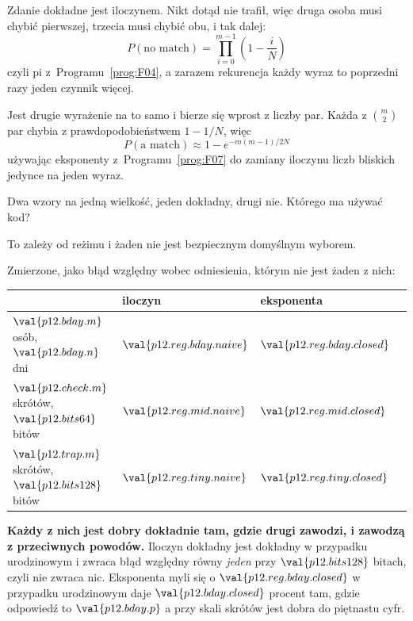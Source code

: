 \begin{fr}
Zdanie dokładne jest iloczynem. Nikt dotąd nie trafił, więc druga osoba musi
chybić pierwszej, trzecia musi chybić obu, i tak dalej:
\[ P(\text{no match}) = \prod_{i=0}^{m-1}\left(1 - \frac{i}{N}\right) \]
czyli pi z~Programu~\ref{prog:F04}, a zarazem rekurencja \dash{} każdy wyraz
to poprzedni razy jeden czynnik więcej.

Jest drugie wyrażenie na to samo i bierze się wprost z liczby par. Każda z
$\binom{m}{2}$ par chybia z prawdopodobieństwem $1 - 1/N$, więc
\[ P(\text{a match}) \approx 1 - e^{-m(m-1)/2N} \]
używając eksponenty z~Programu~\ref{prog:F07} do zamiany iloczynu liczb
bliskich jedynce na jeden wyraz.

Dwa wzory na jedną wielkość, jeden dokładny, drugi nie. Którego ma używać
kod?
\nextframe
\end{fr}

\begin{fr}
\begin{ansblock}
To zależy od reżimu i żaden nie jest bezpiecznym domyślnym wyborem.
\end{ansblock}

Zmierzone, jako błąd względny wobec odniesienia, którym nie jest żaden z nich:

\begin{center}
\begin{tabular}{llll}
\toprule
 & \textbf{iloczyn} & \textbf{eksponenta} \\
\midrule
$\val{p12.bday.m}$ osób, $\val{p12.bday.n}$ dni
  & $\val{p12.reg.bday.naive}$ & $\val{p12.reg.bday.closed}$ \\
$\val{p12.check.m}$ skrótów, $\val{p12.bits64}$ bitów
  & $\val{p12.reg.mid.naive}$ & $\val{p12.reg.mid.closed}$ \\
$\val{p12.trap.m}$ skrótów, $\val{p12.bits128}$ bitów
  & $\val{p12.reg.tiny.naive}$ & $\val{p12.reg.tiny.closed}$ \\
\bottomrule
\end{tabular}
\end{center}

\textbf{Każdy z nich jest dobry dokładnie tam, gdzie drugi zawodzi, i zawodzą
z przeciwnych powodów.} Iloczyn dokładny jest dokładny w przypadku
urodzinowym i zwraca błąd względny równy \emph{jeden} przy
$\val{p12.bits128}$ bitach, czyli nie zwraca nic. Eksponenta myli się o
$\val{p12.reg.bday.closed}$ w przypadku urodzinowym \dash{} daje
$\val{p12.bday.closed}$ procent tam, gdzie odpowiedź to
$\val{p12.bday.p}$ \dash{} a przy skali skrótów jest dobra do piętnastu cyfr.
\end{fr}

